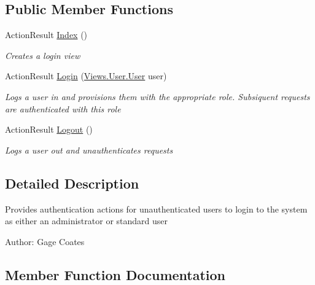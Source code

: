 \subsection*{Public Member Functions}
\begin{DoxyCompactItemize}
\item 
Action\+Result \mbox{\hyperlink{class_eagle_eye_1_1_controllers_1_1_user_controller_a9562eb9abf6432e9360af19bb046a775}{Index}} ()
\begin{DoxyCompactList}\small\item\em Creates a login view \end{DoxyCompactList}\item 
Action\+Result \mbox{\hyperlink{class_eagle_eye_1_1_controllers_1_1_user_controller_ad2199840c954a1a465e25087fee02564}{Login}} (\mbox{\hyperlink{class_eagle_eye_1_1_views_1_1_user_1_1_user}{Views.\+User.\+User}} user)
\begin{DoxyCompactList}\small\item\em Logs a user in and provisions them with the appropriate role. Subsiquent requests are authenticated with this role \end{DoxyCompactList}\item 
Action\+Result \mbox{\hyperlink{class_eagle_eye_1_1_controllers_1_1_user_controller_a23b7abc37b240a70620675d09edecf8c}{Logout}} ()
\begin{DoxyCompactList}\small\item\em Logs a user out and unauthenticates requests \end{DoxyCompactList}\end{DoxyCompactItemize}


\subsection{Detailed Description}
Provides authentication actions for unauthenticated users to login to the system as either an administrator or standard user 

Author\+: Gage Coates

\subsection{Member Function Documentation}
\mbox{\label{class_eagle_eye_1_1_controllers_1_1_user_controller_a9562eb9abf6432e9360af19bb046a775}} 
